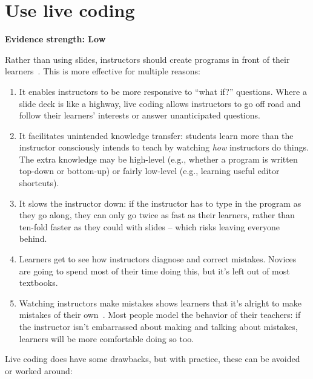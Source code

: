 \documentclass[10pt,letterpaper]{article}
\newcommand{\rulemajor}[2]{\section{#1}\label{#2}}
\newcommand{\evidence}[1]{\vspace{-0.3cm}\textbf{Evidence strength: #1}\vspace{0.5cm}}
\begin{document}
\rulemajor{Use live coding}{live-coding}
\evidence{Low}

Rather than using slides,
instructors should create programs in front of their learners~\cite{rubin-live-coding}.
This is more effective for multiple reasons:

\begin{enumerate}

\item It enables instructors to be more responsive to ``what if?''
  questions. Where a slide deck is like a highway, live coding
  allows instructors to go off road and follow their learners'
  interests or answer unanticipated questions.

\item It facilitates unintended knowledge transfer: students learn
  more than the instructor consciously intends to teach by watching
  \textit{how} instructors do things.  The extra knowledge may be
  high-level (e.g., whether a program is written top-down or
  bottom-up) or fairly low-level (e.g., learning useful editor shortcuts).

\item It slows the instructor down: if the instructor has to type in
  the program as they go along, they can only go twice as fast as
  their learners, rather than ten-fold faster as they could with
  slides -- which risks leaving everyone behind.

\item Learners get to see how instructors diagnose and correct
  mistakes. Novices are going to spend most of their time doing
  this, but it's left out of most textbooks.

\item Watching instructors make mistakes shows learners that it's
  alright to make mistakes of their own~\cite{barker-live-coding}.
  Most people model the behavior of their teachers: if the instructor
  isn't embarrassed about making and talking about mistakes, learners
  will be more comfortable doing so too.

\end{enumerate}

Live coding does have some drawbacks, but with practice, these can be
avoided or worked around:
\end{document}
